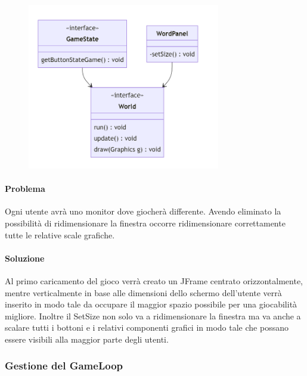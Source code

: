 \documentclass[a4paper,12pt]{report}
\begin{document}
\begin{figure}[H]
    \centering{}
    \includegraphics[width=0.75\textwidth]{img/UMLFinestraDiGioco.png}
    \caption{}
\end{figure}

\paragraph{Problema} Ogni utente avrà uno monitor dove giocherà differente. Avendo eliminato la possibilità di ridimensionare la finestra occorre ridimensionare correttamente tutte le relative scale grafiche.

\paragraph{Soluzione} Al primo caricamento del gioco verrà creato un JFrame centrato orizzontalmente, mentre verticalmente in base alle dimensioni dello schermo dell’utente verrà inserito in modo tale da occupare il maggior spazio possibile per una giocabilità migliore. Inoltre il SetSize non solo va a ridimensionare la finestra ma va anche a scalare tutti i bottoni e i relativi componenti grafici in modo tale che possano essere visibili alla maggior parte degli utenti.

\subsubsection{Gestione del GameLoop}
\end{document}
